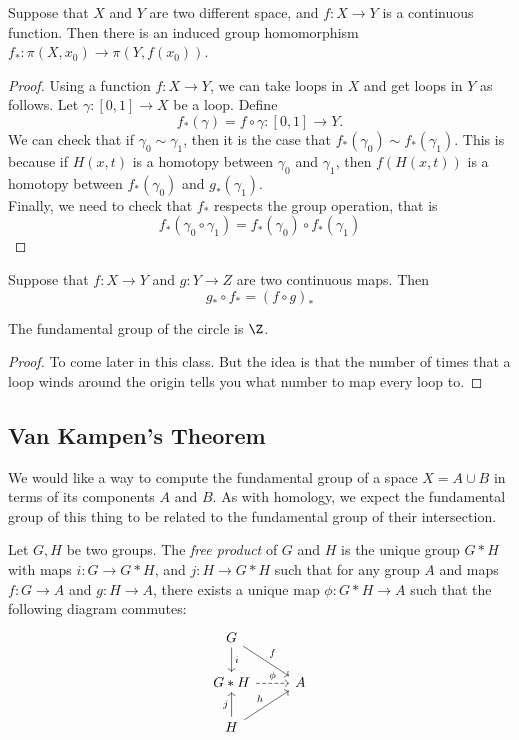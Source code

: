 \begin{claim}
	Suppose that $X$ and $Y$ are two different space,  and $f: X\to Y$ is a continuous function. Then there is an induced group homomorphism $f_*: \pi(X,  x_0)\to \pi(Y,  f(x_0))$. 
\end{claim}
\begin{proof}
	Using a function $f: X\to Y$,  we can take loops in $X$ and get loops in $Y$ as follows. Let $\gamma: [0, 1]\to X$ be a loop. Define 
	\[f_*(\gamma)=f\circ\gamma:[0, 1]\to Y.\]
	We can check that if $\gamma_0 \sim \gamma_1$,  then it is the case that $f_*(\gamma_0)\sim f_*(\gamma_1)$. This is because if $H(x,  t)$ is a homotopy between $\gamma_0$ and $\gamma_1$,  then $f(H(x,  t))$ is a homotopy between $f_*(\gamma_0)$ and $g_*(\gamma_1)$. \\
	Finally,  we need to check that $f_*$ respects the group operation,  that is 
	\[f_*(\gamma_0\circ \gamma_1)=f_*(\gamma_0)\circ f_*(\gamma_1)\]
\end{proof}

\begin{claim}
	Suppose that $f: X\to Y$ and $g: Y\to Z$ are two continuous maps. Then 
	\[g_*\circ f_*=(f\circ g)_*\]
\end{claim}



\begin{theorem}
	The fundamental group of the circle is $\Z$. 
\end{theorem}
\begin{proof}
	To come later in this class. But the idea is that the number of times that a loop winds around the origin tells you what number to map every loop to. 
\end{proof}

\subsection{Van Kampen's Theorem}
We would like a way to compute the fundamental group of a space $X=A\cup B$ in terms of its components $A$ and $B$. As with homology, we expect the fundamental group of this thing to be related to the fundamental group of their intersection. 
\begin{definition}
Let $G, H$ be two groups. The \emph{free product} of $G$ and $H$ is the unique group $G*H$ with maps $i:G\to G*H $, and $j: H\to G*H$ such that for any group $A$ and maps $f: G\to A$ and $g: H\to A$, there exists a unique map $\phi: G*H\to A$ such that the following diagram commutes:
\[
\begin{tikzcd}
G\arrow{d}{i} \arrow{dr}{f}\\  G*H \arrow[dashed]{r}{\phi} & A\\ H\arrow{u}{j} \arrow{ur}{h}
\end{tikzcd}
\]
\end{definition}

